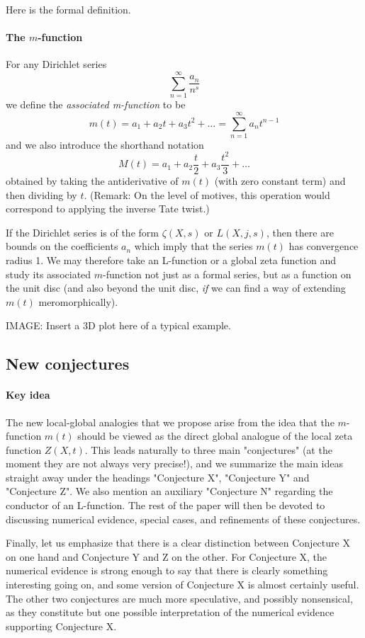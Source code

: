 \documentclass[paper=a4, fontsize=11pt]{scrartcl} %
\numberwithin{equation}{section} %
\numberwithin{figure}{section} %
\numberwithin{table}{section} %
\begin{document}
Here is the formal definition.

\paragraph{The $m$-function}
For any Dirichlet series
$$\sum_{n=1}^{\infty} \frac{a_n}{n^s}$$
we define the \emph{associated m-function} to be
$$ m(t) = a_1 + a_2 t + a_3 t^2 + \ldots =  \sum_{n=1}^{\infty} a_n t^{n-1} $$
and we also introduce the shorthand notation
$$ M(t) = a_1 + a_2 \frac{t}{2} + a_3 \frac{t^2}{3} + \ldots   $$
obtained by taking the antiderivative of $m(t)$ (with zero constant term) and then dividing by $t$. (Remark: On the level of motives, this operation would correspond to applying the inverse Tate twist.)

If the Dirichlet series is of the form $\zeta(X, s)$ or $L(X, j, s)$, then there are bounds on the coefficients $a_n$ which imply that the series $m(t)$ has convergence radius 1. We may therefore take an L-function or a global zeta function and study its associated $m$-function not just as a formal series, but as a function on the unit disc (and also beyond the unit disc, \emph{if} we can find a way of extending $m(t)$ meromorphically).

IMAGE: Insert a 3D plot here of a typical example.


\subsection{New conjectures}

\paragraph{Key idea}
The new local-global analogies that we propose arise from the idea that the $m$-function $m(t)$ should be viewed as the direct global analogue of the local zeta function $Z(X, t)$. This leads naturally to three main "conjectures" (at the moment they are not always very precise!), and we summarize the main ideas straight away under the headings "Conjecture X", "Conjecture Y" and "Conjecture Z". We also mention an auxiliary "Conjecture N" regarding the conductor of an L-function. The rest of the paper will then be devoted to discussing numerical evidence, special cases, and refinements of these conjectures.

Finally, let us emphasize that there is a clear distinction between Conjecture X on one hand and Conjecture Y and Z on the other. For Conjecture X, the numerical evidence is strong enough to say that there is clearly something interesting going on, and some version of Conjecture X is almost certainly useful. The other two conjectures are much more speculative, and possibly nonsensical, as they constitute but one possible interpretation of the numerical evidence supporting Conjecture X.
\end{document}
